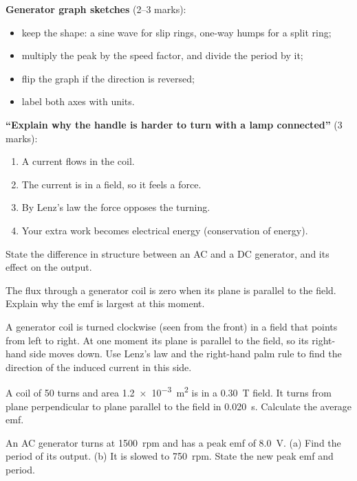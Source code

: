 \begin{examtip}
\textbf{Generator graph sketches} (2--3 marks):
\begin{itemize}
  \item keep the shape: a sine wave for slip rings, one-way humps for a split ring;
  \item multiply the peak by the speed factor, and divide the period by it;
  \item flip the graph if the direction is reversed;
  \item label both axes with units.
\end{itemize}
\textbf{``Explain why the handle is harder to turn with a lamp connected''} (3 marks):
\begin{enumerate}
  \item A current flows in the coil.
  \item The current is in a field, so it feels a force.
  \item By Lenz's law the force opposes the turning.
  \item Your extra work becomes electrical energy (conservation of energy).
\end{enumerate}
\end{examtip}

\begin{quickcheck}[breakable]
  \item State the difference in structure between an AC and a DC generator, and its
        effect on the output.
  \item The flux through a generator coil is zero when its plane is parallel to the
        field. Explain why the emf is largest at this moment.
  \item A generator coil is turned clockwise (seen from the front) in a field that
        points from left to right. At one moment its plane is parallel to the field, so
        its right-hand side moves down. Use Lenz's law and the right-hand palm rule to
        find the direction of the induced current in this side.
  \tcbbreak %
  \item A coil of 50 turns and area \qty{1.2e-3}{m^2} is in a \qty{0.30}{T} field. It
        turns from plane perpendicular to plane parallel to the field in \qty{0.020}{s}.
        Calculate the average emf.
  \item An AC generator turns at \qty{1500}{rpm} and has a peak emf of \qty{8.0}{V}.
        (a) Find the period of its output. (b) It is slowed to \qty{750}{rpm}. State the
        new peak emf and period.
\end{quickcheck}

